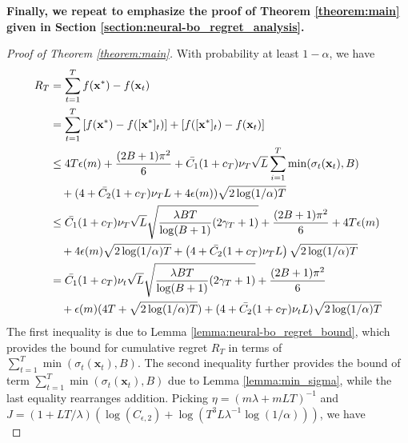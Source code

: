 \textbf{Finally, we repeat to emphasize the proof of Theorem \ref{theorem:main} given in Section \ref{section:neural-bo_regret_analysis}.}
\begin{proof} [Proof of Theorem \ref{theorem:main}]

With probability at least $1-\alpha$, we have
\begin{align*}
 R_T &  = \sum^T_{t=1} f(\mathbf{x^*}) - f(\mathbf{x}_t) \\ 
     & = \sum^T_{t=1} \left[f(\mathbf{x}^*) - f([\mathbf{x}^*]_t)\right] + \left[f([\mathbf{x}^*]_t) - f(\mathbf{x}_t) \right] \\ 
     &\leq 4T \epsilon(m) + \frac{(2B+1)\pi^2}{6} + \Bar{C_1}(1+c_T)\nu_T \sqrt{L} \sum^T_{i=1} \min(\sigma_t(\mathbf{x}_t), B) \\
     & \quad +(4+\Bar{C_2}(1+c_T)\nu_T L + 4\epsilon(m))\sqrt{2 \log(1/\alpha)T} \\
     & \leq \Bar{C_1}(1+c_T)\nu_T \sqrt{L} \sqrt{\frac{\lambda BT}{\log(B+1)} (2\gamma_T+1)} 
     + \frac{(2B+1)\pi^2}{6} + 4T \epsilon(m) \\
     & \quad + 4\epsilon(m)\sqrt{2 \log(1/\alpha)T}  +  \left(4+\Bar{C_2}(1+c_T)\nu_T L\right)\sqrt{2 \log(1/\alpha)T}  \\
     &  = \Bar{C_1}(1+c_T)\nu_t \sqrt{L} \sqrt{\frac{\lambda BT}{\log(B+1)} (2\gamma_T+1)} + \frac{(2B+1)\pi^2}{6} \\
     & \quad +  \epsilon(m)(4T+ \sqrt{2 \log(1/\alpha)T}) + (4+\Bar{C_2}(1+c_T)\nu_t L)\sqrt{2 \log(1/\alpha)T} \\
     \end{align*} 
The first inequality is due to Lemma \ref{lemma:neural-bo_regret_bound}, which provides the bound for cumulative regret $R_T$ in terms of $\sum^T_{t=1} \min(\sigma_t(\mathbf{x}_t),B)$.  The second inequality further provides the bound of term $\sum^T_{t=1} \min(\sigma_t(\mathbf{x}_t),B)$ due to Lemma \ref{lemma:min_sigma}, while the last equality rearranges addition.   Picking $\eta = (m\lambda + mLT)^{-1}$ and $J = \left(1+LT/\lambda \right) \left(\log (C_{\epsilon,2} ) + \log(T^3L\lambda^{-1}\log(1/\alpha)) \right)$, we have 
\begin{equation*}

\end{equation*}
\end{proof}
